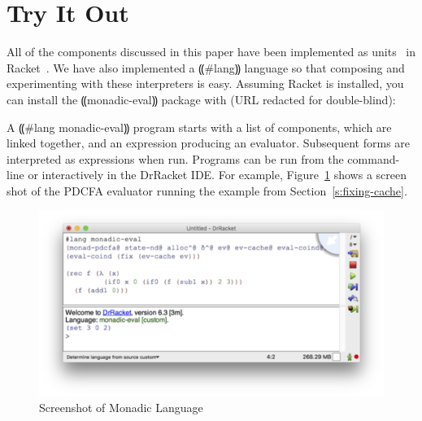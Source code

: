 \section{Try It Out}\label{s:try-it}

All of the components discussed in this paper have been implemented as
units~\cite{local:flatt-pldi98} in Racket~\cite{dvanhorn:plt-tr1}.  We have
also implemented a ⸨#lang⸩ language so that composing and experimenting with
these interpreters is easy.  Assuming Racket is installed, you can install the
⸨monadic-eval⸩ package with (URL redacted for double-blind):

A ⸨#lang monadic-eval⸩ program starts with a list of
components, which are linked together, and an expression producing an
evaluator.  Subsequent forms are interpreted as expressions when run.
Programs can be run from the command-line or interactively in the
DrRacket IDE.  For example, Figure~\ref{f:screen} shows a screen shot of the PDCFA
evaluator running the example from Section~\ref{s:fixing-cache}.

\begin{figure}
\includegraphics[width=\linewidth]{screen.png}
\caption{Screenshot of Monadic Language}
\label{f:screen}
\end{figure}
